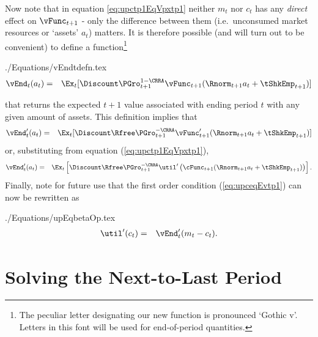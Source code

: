 \documentclass[titlepage]{\econtex}
\begin{document}
Now note that in equation \eqref{eq:upctp1EqVpxtp1} neither ${m}_{t}$ nor
${c}_{t}$ has any \textit{direct} effect on $\null{\vFunc}_{t+1}$ - only the difference between them (i.e.\  unconsumed market resources or `assets' ${a}_t$) matters.  It is therefore possible (and will turn
out to be convenient) to define a function\footnote{The peculiar letter designating our new function is pronounced `Gothic v'.  Letters in this font
  will be used for end-of-period quantities.}
\begin{verbatimwrite}{./Equations/vEndtdefn.tex}
  \begin{eqnarray}
    {\vEnd}_{t}({a}_{t}) & = & \Ex_{t}[\Discount \PGro_{t+1}^{1-\CRRA}\null{\vFunc}_{t+1}(\Rnorm_{t+1} {a}_{t}+{\tShkEmp}_{t+1})]  \label{eq:vEndtdefn}
  \end{eqnarray}
\end{verbatimwrite}

that returns the expected $t+1$ value associated with ending period
$t$ with any given amount of
 assets.  This definition
implies that
\begin{eqnarray}
  {\vEnd}_{t}^{\prime}({a}_{t}) & = & \Ex_{t}[\Discount \Rfree \PGro_{t+1}^{-\CRRA} \null{\vFunc}_{t+1}^{\prime}(\Rnorm_{t+1} {a}_{t}+{\tShkEmp}_{t+1})]  \label{eq:vEndPrimetdefn}
\end{eqnarray}
or, substituting from equation (\ref{eq:upctp1EqVpxtp1}),
\begin{eqnarray}
  {\vEnd}_{t}^{\prime}({a}_{t}) & = & \Ex_{t}\left[\Discount \Rfree \PGro_{t+1}^{-\CRRA} \util^{\prime}\left(\cFunc_{t+1}(\Rnorm_{t+1} {a}_{t}+{\tShkEmp}_{t+1})\right)\right].  \label{eq:vEndPrimetOfc}
\end{eqnarray}
Finally, note for future use that the first order condition
(\ref{eq:upceqEvtp1}) can now be rewritten as
\begin{verbatimwrite}{./Equations/upEqbetaOp.tex}
  \begin{eqnarray}
    \util^{\prime}({c}_{t})  & = & {\vEnd}_{t}^{\prime}({m}_{t}-{c}_{t}).
                                   \label{eq:upEqbetaOp}
  \end{eqnarray}
\end{verbatimwrite}



\hypertarget{Solving-the-Next-To-Last-Period}{}
\section{Solving the Next-to-Last Period}\label{sec:NextToLast}
\end{document}
